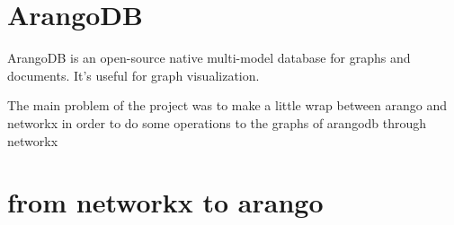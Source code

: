 \documentclass[11pt]{article}
\begin{document}
\section{ArangoDB}
ArangoDB is an open-source native multi-model database for graphs and documents.
It's useful for graph visualization.

The main problem of the project was to make a little wrap between arango and networkx in order to do some operations to the graphs of arangodb through networkx
\section{from networkx to arango}
\end{document}
